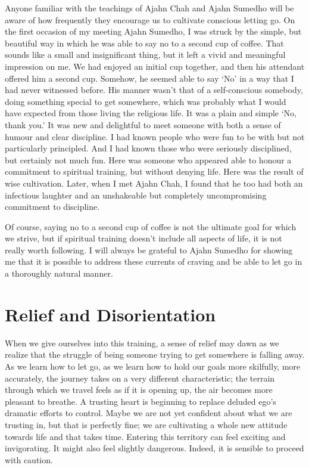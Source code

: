Anyone familiar with the teachings of Ajahn Chah and Ajahn Sumedho will
be aware of how frequently they encourage us to cultivate conscious
letting go. On the first occasion of my meeting Ajahn Sumedho, I was
struck by the simple, but beautiful way in which he was able to say no
to a second cup of coffee. That sounds like a small and insignificant
thing, but it left a vivid and meaningful impression on me. We had
enjoyed an initial cup together, and then his attendant offered him a
second cup. Somehow, he seemed able to say ‘No’ in a way that I had
never witnessed before. His manner wasn’t that of a self-conscious
somebody, doing something special to get somewhere, which was probably
what I would have expected from those living the religious life. It was
a plain and simple ‘No, thank you.’ It was new and delightful to meet
someone with both a sense of humour and clear discipline. I had known
people who were fun to be with but not particularly principled. And I
had known those who were seriously disciplined, but certainly not much
fun. Here was someone who appeared able to honour a commitment to
spiritual training, but without denying life. Here was the result of
wise cultivation. Later, when I met Ajahn Chah, I found that he too had
both an infectious laughter and an unshakeable but completely
uncompromising commitment to discipline.

Of course, saying no to a second cup of coffee is not the ultimate goal
for which we strive, but if spiritual training doesn’t include all
aspects of life, it is not really worth following. I will always be
grateful to Ajahn Sumedho for showing me that it is possible to address
these currents of craving and be able to let go in a thoroughly natural
manner.

\section{Relief and Disorientation}

When we give ourselves into this training, a sense of relief may dawn as
we realize that the struggle of being someone trying to get somewhere is
falling away. As we learn how to let go, as we learn how to hold our
goals more skilfully, more accurately, the journey takes on a very
different characteristic; the terrain through which we travel feels as
if it is opening up, the air becomes more pleasant to breathe. A
trusting heart is beginning to replace deluded ego’s dramatic efforts to
control. Maybe we are not yet confident about what we are trusting in,
but that is perfectly fine; we are cultivating a whole new attitude
towards life and that takes time. Entering this territory can feel
exciting and invigorating. It might also feel slightly dangerous.
Indeed, it is sensible to proceed with caution.

